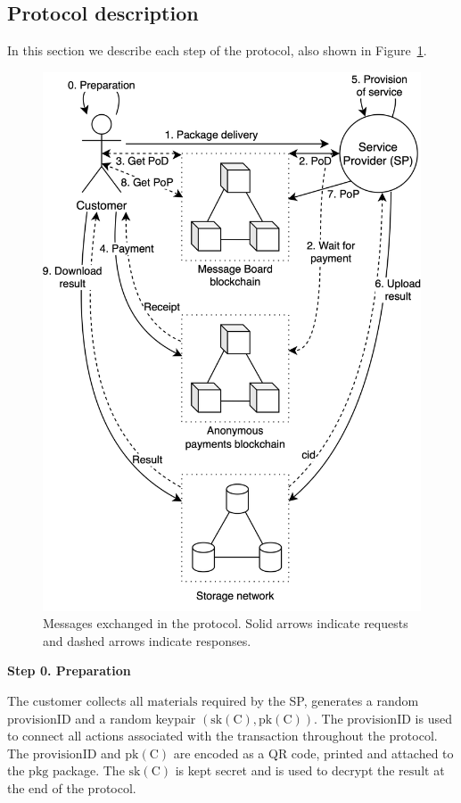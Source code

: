 \documentclass[pdftex,twocolumn,epjc3]{svjour3}
\begin{document}
{\subsection{Protocol description}\label{protocol-description}

In this section we describe each step of the protocol, also shown in Figure~\ref{fig:protocol-diagram}.

\begin{figure}[ht!]
\includegraphics[width=\linewidth]{anonser-protocol.png}
\centering
\caption{Messages exchanged in the protocol. Solid arrows indicate requests and dashed arrows indicate responses.}
\label{fig:protocol-diagram}
\end{figure}

\noindent \textbf
{Step 0.  Preparation}\label{step-0-preparation}

The customer collects all $\mathrm{materials}$ required by the SP, generates a random $\mathrm{provisionID}$ and a random keypair $(\mathrm{sk(C)},\mathrm{pk(C)})$. The $\mathrm{provisionID}$ is used to connect all actions associated with the transaction throughout the protocol. The $\mathrm{provisionID}$ and $\mathrm{pk(C)}$ are encoded as a QR code, printed and attached to the $\mathrm{pkg}$ package. The $\mathrm{sk(C)}$ is kept secret and is used to decrypt the $\mathrm{result}$ at the end of the protocol.

}
\end{document}
